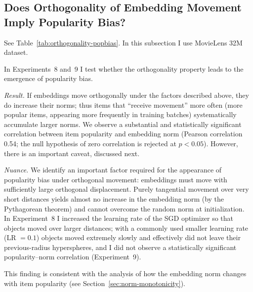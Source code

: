 \subsection{Does Orthogonality of Embedding Movement Imply Popularity Bias?}

See Table~\ref{tab:orthogonality-popbias}. In this subsection I use MovieLens 32M dataset.

In Experiments~8 and~9 I test whether the orthogonality property leads to the emergence of popularity bias. 

\textit{Result.} If embeddings move orthogonally under the factors described above, they do increase their norms; thus items that “receive movement” more often (more popular items, appearing more frequently in training batches) systematically accumulate larger norms. We observe a substantial and statistically significant correlation between item popularity and embedding norm (Pearson correlation 0.54; the null hypothesis of zero correlation is rejected at $p<0.05$). However, there is an important caveat, discussed next.

\textit{Nuance.} We identify an important factor required for the appearance of popularity bias under orthogonal movement: embeddings must move with sufficiently large orthogonal displacement. Purely tangential movement over very short distances yields almost no increase in the embedding norm (by the Pythagorean theorem) and cannot overcome the random norm at initialization. In Experiment~8 I increased the learning rate of the SGD optimizer so that objects moved over larger distances; with a commonly used smaller learning rate (LR $=0.1$) objects moved extremely slowly and effectively did not leave their previous-radius hyperspheres, and I did not observe a statistically significant popularity–norm correlation (Experiment~9).

This finding is consistent with the analysis of how the embedding norm changes with item popularity (see Section~\ref{sec:norm-monotonicity}).

